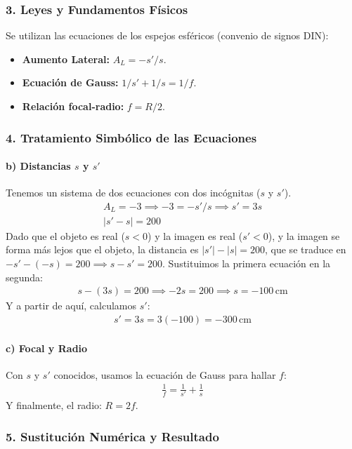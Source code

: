 \subsubsection*{3. Leyes y Fundamentos Físicos}
Se utilizan las ecuaciones de los espejos esféricos (convenio de signos DIN):
\begin{itemize}
    \item \textbf{Aumento Lateral:} $A_L = -s'/s$.
    \item \textbf{Ecuación de Gauss:} $1/s' + 1/s = 1/f$.
    \item \textbf{Relación focal-radio:} $f = R/2$.
\end{itemize}

\subsubsection*{4. Tratamiento Simbólico de las Ecuaciones}
\paragraph{b) Distancias $s$ y $s'$}
Tenemos un sistema de dos ecuaciones con dos incógnitas ($s$ y $s'$).
\begin{gather}
    A_L = -3 \implies -3 = -s'/s \implies s' = 3s \\
    |s' - s| = 200
\end{gather}
Dado que el objeto es real ($s<0$) y la imagen es real ($s'<0$), y la imagen se forma más lejos que el objeto, la distancia es $|s'| - |s| = 200$, que se traduce en $-s' - (-s) = 200 \implies s - s' = 200$.
Sustituimos la primera ecuación en la segunda:
\begin{gather}
    s - (3s) = 200 \implies -2s = 200 \implies s = -100 \, \text{cm}
\end{gather}
Y a partir de aquí, calculamos $s'$:
\begin{gather}
    s' = 3s = 3(-100) = -300 \, \text{cm}
\end{gather}
\paragraph{c) Focal y Radio}
Con $s$ y $s'$ conocidos, usamos la ecuación de Gauss para hallar $f$:
\begin{gather}
    \frac{1}{f} = \frac{1}{s'} + \frac{1}{s}
\end{gather}
Y finalmente, el radio: $R=2f$.

\subsubsection*{5. Sustitución Numérica y Resultado}
